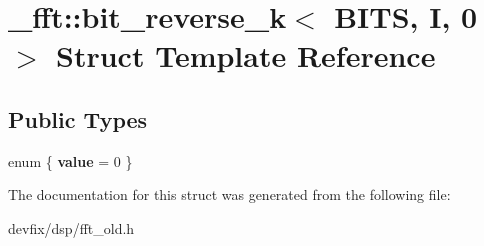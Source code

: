 \hypertarget{struct__fft_1_1bit__reverse__k_3_01BITS_00_01I_00_010_01_4}{}\section{\+\_\+fft\+:\+:bit\+\_\+reverse\+\_\+k$<$ B\+I\+TS, I, 0 $>$ Struct Template Reference}
\label{struct__fft_1_1bit__reverse__k_3_01BITS_00_01I_00_010_01_4}
\subsection*{Public Types}
\begin{DoxyCompactItemize}
\item 
\mbox{\label{struct__fft_1_1bit__reverse__k_3_01BITS_00_01I_00_010_01_4_a8f4c5892c3d0c2e428e9136b9c08a9cc}} 
enum \{ {\bfseries value} = 0
 \}
\end{DoxyCompactItemize}


The documentation for this struct was generated from the following file\+:\begin{DoxyCompactItemize}
\item 
devfix/dsp/fft\+\_\+old.\+h\end{DoxyCompactItemize}
